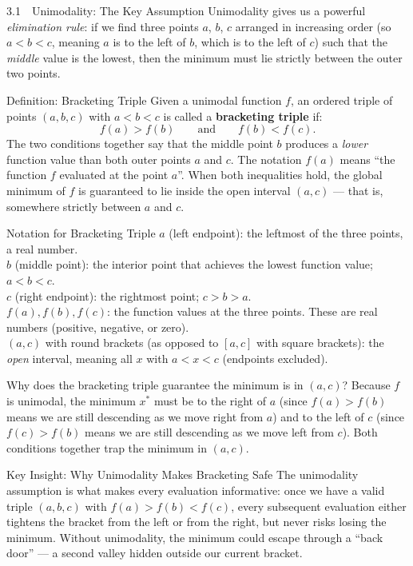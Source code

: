 \documentclass[aspectratio=169,10pt]{beamer}
\begin{document}
\begin{frame}[allowframebreaks]{3.1\ \ Unimodality: The Key Assumption}
  Unimodality gives us a powerful \emph{elimination rule}: if we find three
  points $a$, $b$, $c$ arranged in increasing order (so $a < b < c$, meaning
  $a$ is to the left of $b$, which is to the left of $c$) such that the
  \emph{middle} value is the lowest, then the minimum must lie strictly between
  the outer two points.

  \begin{block}{Definition: Bracketing Triple}
    Given a unimodal function $f$, an ordered triple of points $(a, b, c)$
    with $a < b < c$ is called a \textbf{bracketing triple} if:
    \[
      f(a) > f(b) \qquad \text{and} \qquad f(b) < f(c).
    \]
    The two conditions together say that the middle point $b$ produces a
    \emph{lower} function value than both outer points $a$ and $c$.  The
    notation $f(a)$ means ``the function $f$ evaluated at the point $a$''.
    When both inequalities hold, the global minimum of $f$ is guaranteed to
    lie inside the open interval $(a, c)$ --- that is, somewhere strictly
    between $a$ and $c$.
  \end{block}

  \begin{block}{Notation for Bracketing Triple}
    $a$ (left endpoint): the leftmost of the three points, a real number.\\
    $b$ (middle point): the interior point that achieves the lowest function
    value; $a < b < c$.\\
    $c$ (right endpoint): the rightmost point; $c > b > a$.\\
    $f(a), f(b), f(c)$: the function values at the three points.  These are
    real numbers (positive, negative, or zero).\\
    $(a, c)$ with round brackets (as opposed to $[a, c]$ with square brackets):
    the \emph{open} interval, meaning all $x$ with $a < x < c$ (endpoints
    excluded).
  \end{block}

  Why does the bracketing triple guarantee the minimum is in $(a, c)$?
  Because $f$ is unimodal, the minimum $x^{*}$ must be to the right of $a$
  (since $f(a) > f(b)$ means we are still descending as we move right from
  $a$) and to the left of $c$ (since $f(c) > f(b)$ means we are still
  descending as we move left from $c$).  Both conditions together trap the
  minimum in $(a, c)$.

  \begin{alertblock}{Key Insight: Why Unimodality Makes Bracketing Safe}
    The unimodality assumption is what makes every evaluation informative:
    once we have a valid triple $(a, b, c)$ with $f(a) > f(b) < f(c)$,
    every subsequent evaluation either tightens the bracket from the left or
    from the right, but never risks losing the minimum.  Without unimodality,
    the minimum could escape through a ``back door'' --- a second valley
    hidden outside our current bracket.
  \end{alertblock}

\end{frame}
\end{document}
